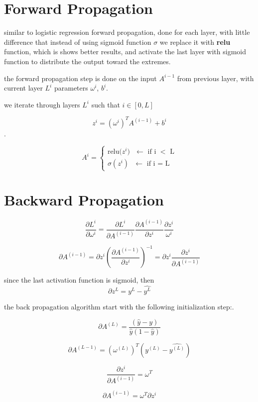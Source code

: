\documentclass[4apaper,12pt]{book}
\begin{document}
\section{Forward Propagation}
\begin{description}
\item similar to logistic regression forward propagation, done for each layer, with little difference that instead of using sigmoid function $\sigma$ we replace it with \textbf{relu} function, which is shows better results, and activate the last layer with sigmoid function to distribute the output toward the extremes.
\item the forward propagation step is done on the input $A^{i-1}$ from previous layer, with current layer $L^i$ parameters $\omega^i$, $b^i$.
  \item we iterate through layers $L^i$ such that $i \in [0,L]$
\item  $$z^i=(\omega^i)^TA^{(i-1)}+b^i$$.
\item $$
  A^i=\begin{cases}
  \text{relu{($z^i$)} $\leftarrow$ if i $<$ L} \\
  \text{$\sigma(z^i)$ $\leftarrow$ if i = L}
  \end{cases}
  $$

\end{description}

\section{Backward Propagation}
\begin{description}
\item $$
  \frac{\partial{L^i}}{\partial{\omega^i}}=
    \frac{\partial{L^i}}{\partial{A^{(i-1)}}}
      \frac{\partial{A^{(i-1)}}}{\partial{z^i}}
        \frac{\partial{z^i}}{\omega^i}
        $$
      \item $$\partial{A^{(i-1)}}=\partial{z^i}
        (\frac{\partial{A^{(i-1)}}}{\partial{z^i}})^{-1}=
        \partial{z^i}\frac{\partial{z^i}}{\partial{A^{(i-1)}}}
        $$

      \item since the last activation function is sigmoid, then $$\partial{z^L}=y^L-\hat{y^L}$$
        \item the back propagation algorithm start with the following initialization step:.
        \item $$ \partial{A^{(L)}} = \frac{(\hat{y}-y)}{\hat{y}(1-\hat{y})} $$
        \item $$\partial{A^{(L-1)}} = (\omega^{(L)})^T(y^{(L)}-\hat{y^{(L)}})$$
        \item $$ \frac{\partial{z^i}}{\partial{A^{(i-1)}}} = \omega^T $$
        \item $$\partial{A^{(i-1)}}=\omega^T\partial{z^i}$$

\end{description}
\end{document}

